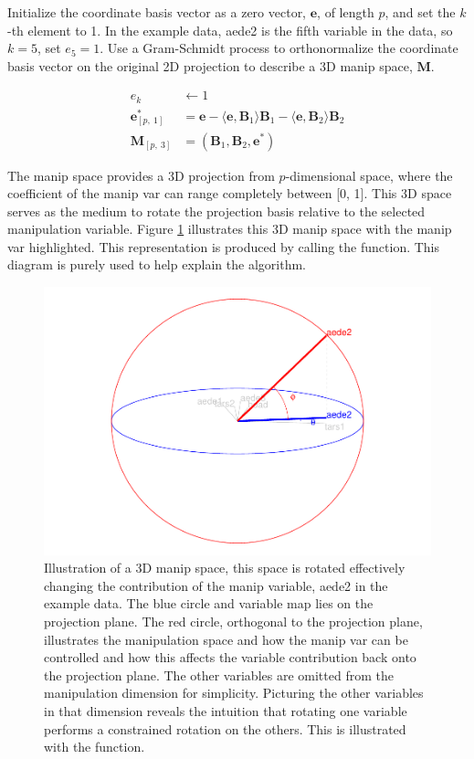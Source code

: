 Initialize the coordinate basis vector as a zero vector, \(\textbf{e}\),
of length \(p\), and set the \(k\)-th element to 1. In the example data,
aede2 is the fifth variable in the data, so \(k=5\), set \(e_5=1\). Use
a Gram-Schmidt process to orthonormalize the coordinate basis vector on
the original 2D projection to describe a 3D manip space, \(\textbf{M}\).

\begin{align*}
  e_k &\leftarrow 1 \\ 
  \textbf{e}^*_{[p,~1]} &= \textbf{e} - \langle \textbf{e}, \textbf{B}_1 \rangle \textbf{B}_1 - \langle \textbf{e}, \textbf{B}_2 \rangle \textbf{B}_2 \\ 
  \textbf{M}_{[p,~3]} &= (\textbf{B}_1,\textbf{B}_2,\textbf{e}^*)
\end{align*}

The manip space provides a 3D projection from \(p\)-dimensional space,
where the coefficient of the manip var can range completely between
{[}0, 1{]}. This 3D space serves as the medium to rotate the projection
basis relative to the selected manipulation variable. Figure
\ref{fig:step2} illustrates this 3D manip space with the manip var
highlighted. This representation is produced by calling the
 function. This diagram is purely used to
help explain the algorithm.

\begin{Schunk}
\begin{figure}

{\centering \includegraphics[width=0.7\linewidth]{spyrison-cook_files/figure-latex/step2-1} 

}

\caption[Illustration of a 3D manip space, this space is rotated effectively changing the contribution of the manip variable, aede2 in the example data]{Illustration of a 3D manip space, this space is rotated effectively changing the contribution of the manip variable, aede2 in the example data. The blue circle and variable map lies on the projection plane. The red circle, orthogonal to the projection plane, illustrates the manipulation space and how the manip var can be controlled and how this affects the variable contribution back onto the projection plane. The other variables are omitted from the manipulation dimension for simplicity. Picturing the other variables in that dimension reveals the intuition that rotating one variable performs a constrained rotation on the others. This is illustrated with the  function.}\label{fig:step2}
\end{figure}
\end{Schunk}

